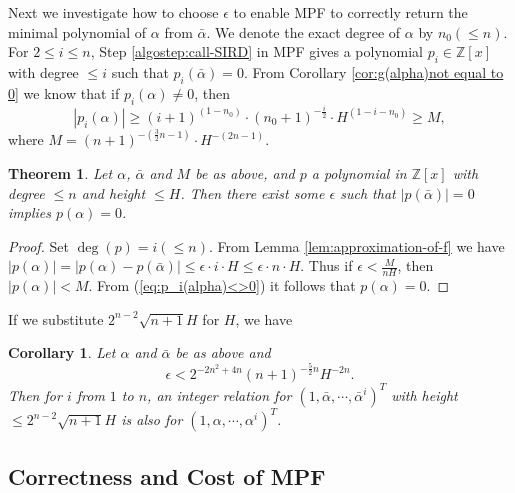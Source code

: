 \documentclass{sig-alternate}
\newtheorem{thm}[theorem]{Theorem}
\newtheorem{cor}[theorem]{Corollary}
\numberwithin{theorem}{section} \numberwithin{equation}{section}
\begin{document}
Next we investigate how to choose $\epsilon$ to enable MPF to
correctly return the minimal polynomial of $\alpha$ from
$\bar{\alpha}$. We denote the exact degree of $\alpha$ by $n_0(\leq
n)$. For $2\leq i\leq n$, Step \ref{algostep:call-SIRD} in MPF gives
a polynomial $p_i\in\mathbb{Z}[x]$ with degree $\leq i$ such that
$p_i(\bar{\alpha})=0$.
From Corollary \ref{cor:g(alpha)not equal to
0} we know that if $p_i(\alpha)\neq 0$, then
\begin{equation}\label{eq:p_i(alpha)<>0} |p_i(\alpha)| \geq (i +
1)^{(1-n_0)}\cdot(n_0+1)^{-\frac{i}{2}}\cdot H^{(1-i-n_0)}\geq M ,
\end{equation}
where $M = (n + 1)^{-(\frac{3}{2}n-1)}\cdot
H^{-(2n-1)}$. 



\begin{thm}
Let $\alpha$, $\bar{\alpha}$ and $M$ be as above, and $p$ a polynomial in $\mathbb{Z}[x]$ with degree $\leq n$ and
height $\leq H$. Then there exist some $\epsilon$ such that
$|p(\bar{\alpha})| =0$ implies $p(\alpha) = 0$.
\end{thm}

\begin{proof}


Set $\deg(p)=i(\leq n)$. From Lemma \ref{lem:approximation-of-f} we
have $|p(\alpha)|=|p(\alpha)-p(\bar{\alpha})|\leq \epsilon\cdot
i\cdot H\leq \epsilon\cdot n\cdot H$. Thus if $\epsilon<\frac{M}{nH}$,
then  $|p(\alpha)|<M$. From (\ref{eq:p_i(alpha)<>0}) it follows that
$p(\alpha)=0$.
\end{proof}

If we substitute $2^{n-2}\sqrt{n+1}H$ for $H$, we have

\begin{cor}\label{cor:epsilon-control}
Let $\alpha$ and $\bar{\alpha}$  be as above and
\begin{equation}\label{eq:error-controlling}
\epsilon<2^{-2n^2+4n}(n+1)^{-\frac{5}{2}n}H^{-2n}.
\end{equation} Then for $i$ from $1$ to $n$, an integer relation for
$(1,\bar{\alpha},\cdots,\bar{\alpha}^i)^T$ with height $\leq
2^{n-2}\sqrt{n+1}H$ is also for $(1,\alpha,\cdots,\alpha^i)^T$.
\end{cor}


\subsection{Correctness and Cost of MPF}
\end{document}
